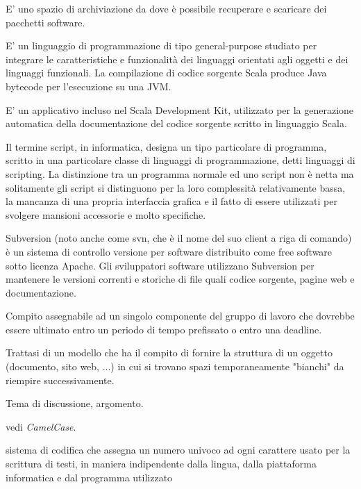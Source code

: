 \documentclass{scalatekids-article}
\begin{document}
   E' uno spazio di archiviazione da dove è possibile recuperare e scaricare dei pacchetti software.


   E' un linguaggio di programmazione di tipo general-purpose studiato per integrare le caratteristiche e funzionalità dei linguaggi orientati agli oggetti e dei linguaggi funzionali. La compilazione di codice sorgente Scala produce Java bytecode per l'esecuzione su una JVM.

   E' un applicativo incluso nel Scala Development Kit, utilizzato per la generazione automatica della documentazione del codice sorgente scritto in linguaggio Scala.

   Il termine script, in informatica, designa un tipo particolare di programma, scritto in una particolare classe di linguaggi di programmazione, detti linguaggi di scripting.
  La distinzione tra un programma normale ed uno script non è netta ma solitamente gli script si distinguono per la loro complessità relativamente bassa, la mancanza di una propria interfaccia grafica e il fatto di essere utilizzati per svolgere mansioni accessorie e molto specifiche.

   Subversion (noto anche come svn, che è il nome del suo client a riga di comando) è un sistema di controllo versione per software distribuito come free software sotto licenza Apache.
  Gli sviluppatori software utilizzano Subversion per mantenere le versioni correnti e storiche di file quali codice sorgente, pagine web e documentazione.


   Compito assegnabile ad un singolo componente del gruppo di lavoro che dovrebbe essere ultimato entro un periodo di tempo prefissato o entro una deadline. %

   Trattasi di un modello che ha il compito di fornire la struttura di un oggetto (documento, sito web, ...) in cui si trovano spazi temporaneamente "bianchi" da riempire successivamente.

   Tema di discussione, argomento.


   vedi \textit{CamelCase}.

   sistema di codifica che assegna un numero univoco ad ogni carattere usato per la scrittura di testi, in maniera indipendente dalla lingua, dalla piattaforma informatica e dal programma utilizzato
\end{document}
